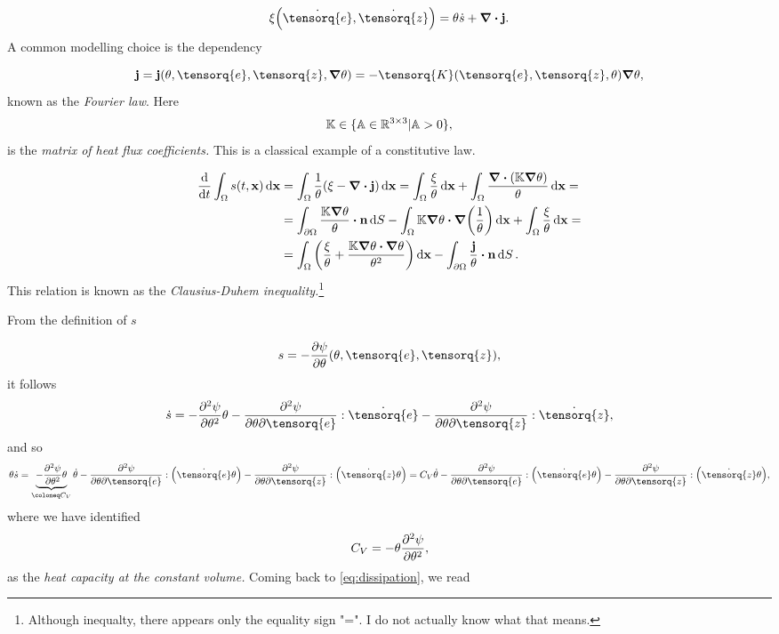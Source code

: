 \documentclass[11pt]{scrartcl} %
\begin{document}
\begin{equation}
	\label{eq:dissipation}
	\xi\qty(\dot{\tensorq{e}}, \dot{\tensorq{z}}) = \theta \dot{s} + \divergence{\vb{j}}.
\end{equation}
A common modelling choice is the dependency

\[
	\vb{j} = \vb{j}\qty(\theta, \tensorq{e}, \tensorq{z}, \grad \theta) = - \tensorq{K}\qty(\tensorq{e}, \tensorq{z}, \theta)\grad \theta,
\]
known as the \textit{Fourier law}. Here
\[
	\mathbb{K} \in \{ \mathbb{A} \in {\mathbb R}^{3 \times 3}| \mathbb{A} >0\},
\]
is the \textit{matrix of heat flux coefficients.} This is a classical example of a constitutive law.


\begin{align*}
	\dv{t} \int_{\Omega}s\qty(t,\vb{x})\dd{\vb{x}} &= \int_{\Omega}\frac{1}{\theta}\qty(\xi-\divergence{\vb{j}})\dd{\vb{x}} = \int_{\Omega}\frac{\xi}{\theta}\dd{\vb{x}} + \int_{\Omega}\frac{\divergence{\qty(\tensorq{K} \grad \theta)}}{\theta}\dd{\vb{x}} = \\
						       & = \int_{\partial \Omega}\frac{\tensorq{K}\grad \theta}{\theta} \vdot \vb{n}\dd{S} - \int_{\Omega}\tensorq{K} \grad \theta \vdot \grad\qty(\frac{1}{\theta})\dd{\vb{x}}+\int_{\Omega}\frac{\xi}{\theta}\dd{\vb{x}} = \\
						       & = \int_{\Omega}\qty(\frac{\xi}{\theta}+ \frac{\tensorq{K}\grad \theta \vdot \grad \theta}{\theta^{2}})\dd{\vb{x}}-\int_{\partial \Omega}\frac{\vb{j}}{\theta} \vdot \vb{n}\dd{S}.
\end{align*}
This relation is known as the \textit{Clausius-Duhem inequality.}\footnote{Although inequalty, there appears only the equality sign "=". I do not actually know what that means.}

From the definition of $s$

\[
	s = - \pdv{\psi}{\theta}\qty(\theta, \tensorq{e}, \tensorq{z}),
\]
it follows
\[
	\dot{s} = -\pdv[2]{\psi}{\theta} \theta - \pdv[2]{\psi}{\theta}{\tensorq{e}}:\dot{\tensorq{e}} - \pdv[2]{\psi}{\theta}{\tensorq{z}}:\dot{\tensorq{z}},
\]
and so
\[
	\theta \dot{s} = \underbrace{- \pdv[2]{\psi}{\theta} \theta}_{\coloneq C_V} \dot{\theta} - \pdv[2]{\psi}{\theta}{\tensorq{e}}:\qty(\dot{\tensorq{e}} \theta) - \pdv[2]{\psi}{\theta}{\tensorq{z}}:\qty(\dot{\tensorq{z}}\theta) = C_V \dot{\theta} - \pdv[2]{\psi}{\theta}{\tensorq{e}}:\qty(\dot{\tensorq{e}}\theta)- \pdv[2]{\psi}{\theta}{\tensorq{z}}:\qty(\dot{\tensorq{z}}\theta),
\]
where we have identified
\[
	C_V = - \theta \pdv[2]{\psi}{\theta},
\]
as the \textit{heat capacity at the constant volume.} Coming back to \ref{eq:dissipation}, we read
\end{document}
